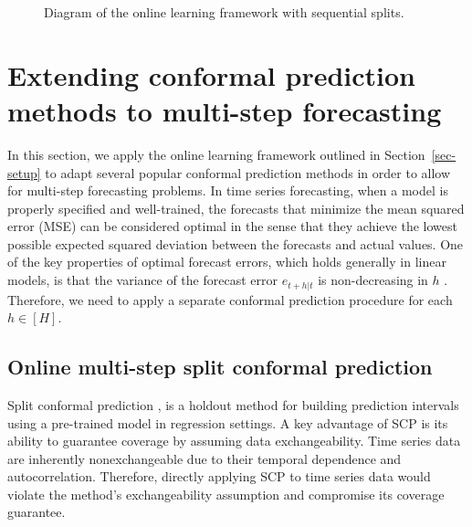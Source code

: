 \documentclass[
  11pt,
  a4paper,
]{article}
\theoremstyle{plain}
\theoremstyle{remark}
\begin{document}
\begin{figure}


\caption{\label{fig-flowchart}Diagram of the online learning framework
with sequential splits.}

\end{figure}%

\section{Extending conformal prediction methods to multi-step
forecasting}\label{sec-ext}

In this section, we apply the online learning framework outlined in
Section~\ref{sec-setup} to adapt several popular conformal prediction
methods in order to allow for multi-step forecasting problems. In time
series forecasting, when a model is properly specified and well-trained,
the forecasts that minimize the mean squared error (MSE) can be
considered optimal in the sense that they achieve the lowest possible
expected squared deviation between the forecasts and actual values. One
of the key properties of optimal forecast errors, which holds generally
in linear models, is that the variance of the forecast error
\(e_{t+h|t}\) is non-decreasing in \(h\)
\autocite{tong1990,diebold1996,patton2007}. Therefore, we need to apply
a separate conformal prediction procedure for each \(h \in [H]\).

\subsection{Online multi-step split conformal
prediction}\label{online-multi-step-split-conformal-prediction}

Split conformal prediction \autocites[SCP, also called inductive
conformal prediction,][]{papadopoulos2002,vovk2005,lei2018}, is a
holdout method for building prediction intervals using a pre-trained
model in regression settings. A key advantage of SCP is its ability to
guarantee coverage by assuming data exchangeability. Time series data
are inherently nonexchangeable due to their temporal dependence and
autocorrelation. Therefore, directly applying SCP to time series data
would violate the method's exchangeability assumption and compromise its
coverage guarantee.
\end{document}
